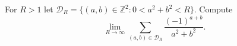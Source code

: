 For $R>1$ let $\mathcal{D}_R =\{ (a,b)\in \mathbb{Z}^2: 0<a^2+b^2<R\}$. Compute
$$\lim_{R\rightarrow \infty}{\sum_{(a,b)\in \mathcal{D}_R}{\frac{(-1)^{a+b}}{a^2+b^2}}}.$$
